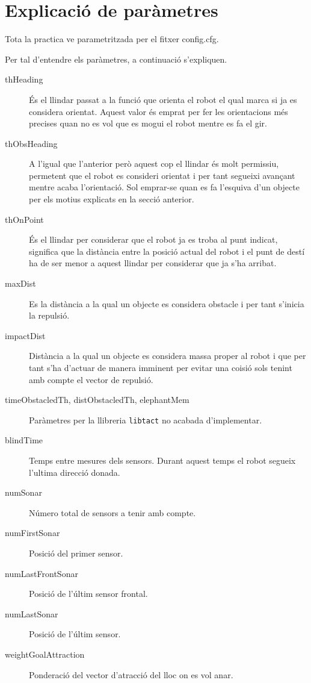 \section{Explicació de paràmetres}

Tota la practica ve parametritzada per el fitxer config.cfg.

Per tal d'entendre els paràmetres, a continuació s'expliquen.

\begin{description}
  \item[thHeading] És el llindar passat a la funció que orienta el robot el qual marca si ja es considera orientat.
Aquest valor és emprat per fer les orientacions més precises quan no es vol que
es mogui el robot mentre es fa el gir.
  \item[thObsHeading] A l'igual que l'anterior però aquest cop el llindar és molt permissiu, permetent que el robot
es consideri orientat i per tant segueixi avançant mentre acaba l'orientació. Sol emprar-se quan es fa l'esquiva
d'un objecte per els motius explicats en la secció anterior.
  \item[thOnPoint] És el llindar per considerar que el robot ja es troba al punt
indicat, significa que la distància
entre la posició actual del robot i el punt de destí ha de ser menor a aquest
llindar per considerar que ja s'ha arribat.
  \item[maxDist] Es la distància a la qual un objecte es considera obstacle i per tant s'inicia la repulsió.
  \item[impactDist] Distància a la qual un objecte es considera massa proper al robot i que per tant s'ha
d'actuar de manera imminent per evitar una co\lgem isió sols tenint amb compte el vector de repulsió.
  \item[timeObstacledTh, distObstacledTh, elephantMem] Paràmetres per la llibreria \texttt{libtact} no acabada d'implementar.
  \item[blindTime] Temps entre mesures dels sensors. Durant aquest temps el
robot segueix l'ultima direcció donada.
  \item[numSonar] Número total de sensors a tenir amb compte.
  \item[numFirstSonar] Posició del primer sensor.
  \item[numLastFrontSonar] Posició de l'últim sensor frontal.
  \item[numLastSonar] Posició de l'últim sensor.
  \item[weightGoalAttraction] Ponderació del vector d'atracció del lloc on es vol anar.

\end{description}
